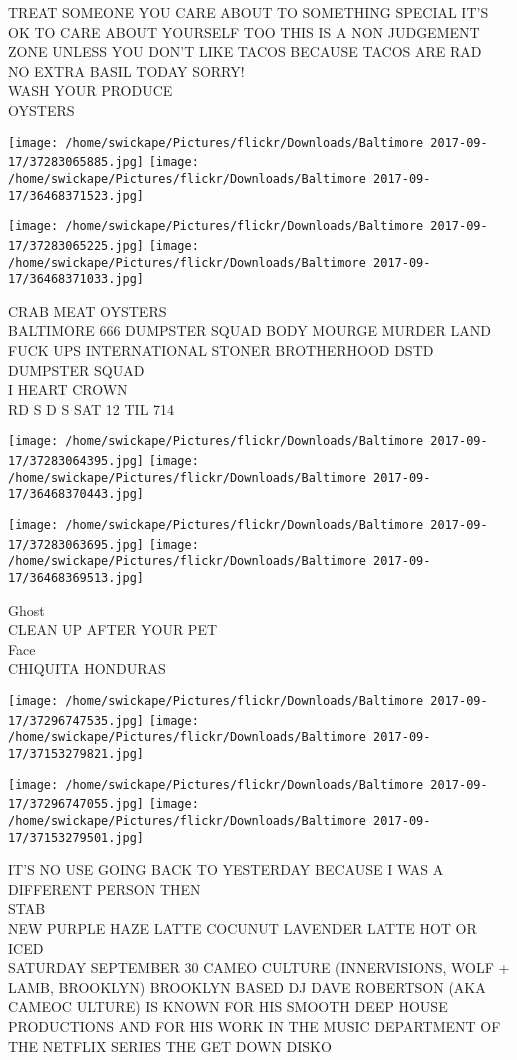 \documentclass[10pt,letterpaper]{article}
\begin{document}
TREAT SOMEONE YOU CARE ABOUT TO SOMETHING SPECIAL IT'S OK TO CARE ABOUT YOURSELF TOO THIS IS A NON JUDGEMENT ZONE UNLESS YOU DON'T LIKE TACOS BECAUSE TACOS ARE RAD\\
NO EXTRA BASIL TODAY SORRY!\\
WASH YOUR PRODUCE\\
OYSTERS
\pagebreak

\texttt{[image: /home/swickape/Pictures/flickr/Downloads/Baltimore 2017-09-17/37283065885.jpg]}
\texttt{[image: /home/swickape/Pictures/flickr/Downloads/Baltimore 2017-09-17/36468371523.jpg]}

\texttt{[image: /home/swickape/Pictures/flickr/Downloads/Baltimore 2017-09-17/37283065225.jpg]}
\texttt{[image: /home/swickape/Pictures/flickr/Downloads/Baltimore 2017-09-17/36468371033.jpg]}

CRAB MEAT OYSTERS\\
BALTIMORE 666 DUMPSTER SQUAD BODY MOURGE MURDER LAND FUCK UPS INTERNATIONAL STONER BROTHERHOOD DSTD DUMPSTER SQUAD\\
I HEART CROWN\\
RD S D S SAT 12 TIL 714
\pagebreak

\texttt{[image: /home/swickape/Pictures/flickr/Downloads/Baltimore 2017-09-17/37283064395.jpg]}
\texttt{[image: /home/swickape/Pictures/flickr/Downloads/Baltimore 2017-09-17/36468370443.jpg]}

\texttt{[image: /home/swickape/Pictures/flickr/Downloads/Baltimore 2017-09-17/37283063695.jpg]}
\texttt{[image: /home/swickape/Pictures/flickr/Downloads/Baltimore 2017-09-17/36468369513.jpg]}

Ghost\\
CLEAN UP AFTER YOUR PET\\
Face\\
CHIQUITA HONDURAS
\pagebreak

\texttt{[image: /home/swickape/Pictures/flickr/Downloads/Baltimore 2017-09-17/37296747535.jpg]}
\texttt{[image: /home/swickape/Pictures/flickr/Downloads/Baltimore 2017-09-17/37153279821.jpg]}

\texttt{[image: /home/swickape/Pictures/flickr/Downloads/Baltimore 2017-09-17/37296747055.jpg]}
\texttt{[image: /home/swickape/Pictures/flickr/Downloads/Baltimore 2017-09-17/37153279501.jpg]}

IT'S NO USE GOING BACK TO YESTERDAY BECAUSE I WAS A DIFFERENT PERSON THEN\\
STAB\\
NEW PURPLE HAZE LATTE COCUNUT LAVENDER LATTE HOT OR ICED\\
SATURDAY SEPTEMBER 30 CAMEO CULTURE (INNERVISIONS, WOLF + LAMB, BROOKLYN) BROOKLYN BASED DJ DAVE ROBERTSON (AKA CAMEOC ULTURE) IS KNOWN FOR HIS SMOOTH DEEP HOUSE PRODUCTIONS AND FOR HIS WORK IN THE MUSIC DEPARTMENT OF THE NETFLIX SERIES THE GET DOWN DISKO
\pagebreak
\end{document}
